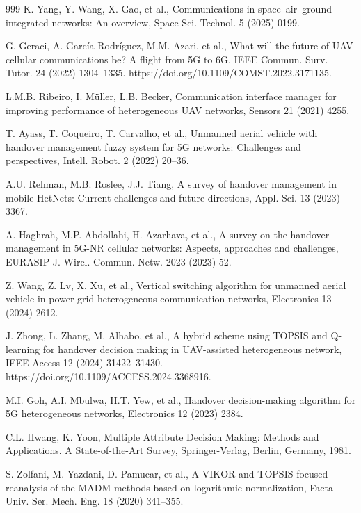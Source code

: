 \documentclass[preprint,12pt]{elsarticle}
\begin{document}
\begin{thebibliography}{999}
K. Yang, Y. Wang, X. Gao, et al., Communications in space--air--ground integrated networks: An overview, Space Sci. Technol. 5 (2025) 0199.

G. Geraci, A. García-Rodríguez, M.M. Azari, et al., What will the future of UAV cellular communications be? A flight from 5G to 6G, IEEE Commun. Surv. Tutor. 24 (2022) 1304--1335. https://doi.org/10.1109/COMST.2022.3171135.

L.M.B. Ribeiro, I. Müller, L.B. Becker, Communication interface manager for improving performance of heterogeneous UAV networks, Sensors 21 (2021) 4255.

T. Ayass, T. Coqueiro, T. Carvalho, et al., Unmanned aerial vehicle with handover management fuzzy system for 5G networks: Challenges and perspectives, Intell. Robot. 2 (2022) 20--36.

A.U. Rehman, M.B. Roslee, J.J. Tiang, A survey of handover management in mobile HetNets: Current challenges and future directions, Appl. Sci. 13 (2023) 3367.

A. Haghrah, M.P. Abdollahi, H. Azarhava, et al., A survey on the handover management in 5G-NR cellular networks: Aspects, approaches and challenges, EURASIP J. Wirel. Commun. Netw. 2023 (2023) 52.

Z. Wang, Z. Lv, X. Xu, et al., Vertical switching algorithm for unmanned aerial vehicle in power grid heterogeneous communication networks, Electronics 13 (2024) 2612.

J. Zhong, L. Zhang, M. Alhabo, et al., A hybrid scheme using TOPSIS and Q-learning for handover decision making in UAV-assisted heterogeneous network, IEEE Access 12 (2024) 31422--31430. https://doi.org/10.1109/ACCESS.2024.3368916.

M.I. Goh, A.I. Mbulwa, H.T. Yew, et al., Handover decision-making algorithm for 5G heterogeneous networks, Electronics 12 (2023) 2384.

C.L. Hwang, K. Yoon, Multiple Attribute Decision Making: Methods and Applications. A State-of-the-Art Survey, Springer-Verlag, Berlin, Germany, 1981.

S. Zolfani, M. Yazdani, D. Pamucar, et al., A VIKOR and TOPSIS focused reanalysis of the MADM methods based on logarithmic normalization, Facta Univ. Ser. Mech. Eng. 18 (2020) 341--355.


\end{thebibliography}
\end{document}
